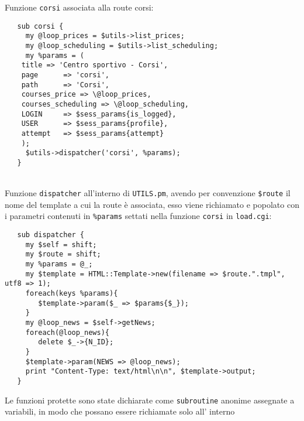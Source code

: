 \small{Funzione \texttt{corsi} associata alla route corsi:}

\scriptsize{
\begin{verbatim}
   sub corsi {
     my @loop_prices = $utils->list_prices;
     my @loop_scheduling = $utils->list_scheduling;
     my %params = (
	title => 'Centro sportivo - Corsi',
	page      => 'corsi',
	path      => 'Corsi',
	courses_price => \@loop_prices,
	courses_scheduling => \@loop_scheduling,
	LOGIN     => $sess_params{is_logged},
	USER      => $sess_params{profile},
	attempt   => $sess_params{attempt}
	);
     $utils->dispatcher('corsi', %params);
   }
\end{verbatim}
}
\leavevmode \\
\small{Funzione \texttt{dispatcher} all'interno di \texttt{UTILS.pm}, avendo per convenzione \texttt{\$route} il nome del template a cui la route è associata, esso viene richiamato e popolato con i parametri contenuti in \texttt{\%params} settati nella funzione \texttt{corsi} in \texttt{load.cgi}:}
 
\scriptsize{
\begin{verbatim}
   sub dispatcher {
     my $self = shift;
     my $route = shift;
     my %params = @_;
     my $template = HTML::Template->new(filename => $route.".tmpl", utf8 => 1);
     foreach(keys %params){
        $template->param($_ => $params{$_});
     }	
     my @loop_news = $self->getNews;
     foreach(@loop_news){
        delete $_->{N_ID};
     }
     $template->param(NEWS => @loop_news);
     print "Content-Type: text/html\n\n", $template->output;
   }
\end{verbatim}
}
 Le funzioni protette sono state dichiarate come \texttt{subroutine} anonime assegnate a variabili, in modo che possano essere richiamate solo all' interno
